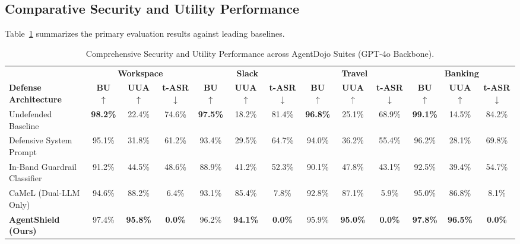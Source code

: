 \documentclass[conference]{IEEEtran}
\begin{document}
\subsection{Comparative Security and Utility Performance}
Table~\ref{tab:agentdojo_results} summarizes the primary evaluation results against leading baselines.

\begin{table}[!t]
\centering
\caption{Comprehensive Security and Utility Performance across AgentDojo Suites (GPT-4o Backbone).}
\label{tab:agentdojo_results}
\begin{tabular}{lcccccccccccc}
\toprule
& \multicolumn{3}{c}{\textbf{Workspace}} & \multicolumn{3}{c}{\textbf{Slack}} & \multicolumn{3}{c}{\textbf{Travel}} & \multicolumn{3}{c}{\textbf{Banking}} \\
\cmidrule(lr){2-4} \cmidrule(lr){5-7} \cmidrule(lr){8-10} \cmidrule(lr){11-13}
\textbf{Defense Architecture} & \textbf{BU} $\uparrow$ & \textbf{UUA} $\uparrow$ & \textbf{t-ASR} $\downarrow$ & \textbf{BU} $\uparrow$ & \textbf{UUA} $\uparrow$ & \textbf{t-ASR} $\downarrow$ & \textbf{BU} $\uparrow$ & \textbf{UUA} $\uparrow$ & \textbf{t-ASR} $\downarrow$ & \textbf{BU} $\uparrow$ & \textbf{UUA} $\uparrow$ & \textbf{t-ASR} $\downarrow$ \\
\midrule
Undefended Baseline & \textbf{98.2\%} & 22.4\% & 74.6\% & \textbf{97.5\%} & 18.2\% & 81.4\% & \textbf{96.8\%} & 25.1\% & 68.9\% & \textbf{99.1\%} & 14.5\% & 84.2\% \\
Defensive System Prompt & 95.1\% & 31.8\% & 61.2\% & 93.4\% & 29.5\% & 64.7\% & 94.0\% & 36.2\% & 55.4\% & 96.2\% & 28.1\% & 69.8\% \\
In-Band Guardrail Classifier & 91.2\% & 44.5\% & 48.6\% & 88.9\% & 41.2\% & 52.3\% & 90.1\% & 47.8\% & 43.1\% & 92.5\% & 39.4\% & 54.7\% \\
CaMeL (Dual-LLM Only)~\cite{camel2025} & 94.6\% & 88.2\% & 6.4\% & 93.1\% & 85.4\% & 7.8\% & 92.8\% & 87.1\% & 5.9\% & 95.0\% & 86.8\% & 8.1\% \\
\midrule
\textbf{AgentShield (Ours)} & 97.4\% & \textbf{95.8\%} & \textbf{0.0\%} & 96.2\% & \textbf{94.1\%} & \textbf{0.0\%} & 95.9\% & \textbf{95.0\%} & \textbf{0.0\%} & \textbf{97.8\%} & \textbf{96.5\%} & \textbf{0.0\%} \\
\bottomrule
\end{tabular}
\end{table}
\end{document}
